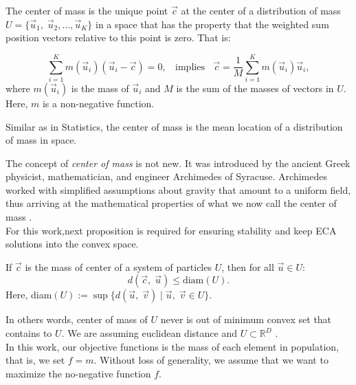 \documentclass[graybox]{svmult}
\begin{document}
\begin{definition}
	The center of mass is the unique point $\vec{c}$ at the center of a distribution
	of mass $U = \{\vec{u}_1,\; \vec{u}_2 , \ldots , \vec{u}_K \}$ in a space that 
	has the property that the weighted sum position vectors relative to this point 
	is zero. That is:

	\begin{equation}
		\sum_{i = 1}^K m(\vec{u}_i) (\vec{u}_i - \vec{c}) = 0, \;\; \text{ implies } \;\; 
		\vec{c} = \dfrac{1}{M} \sum_{i = 1}^K  m(\vec{u}_i)  \vec{u}_i,
		\label{eq:masscenter}
	\end{equation}
	where $m(\vec{u}_i)$ is the mass of $\vec{u}_i$ and  $M$ is the sum of the 
	masses of vectors in $U$. Here, $m$ is a non-negative function.
\end{definition}
%
%
\begin{note}
Similar as in Statistics, the center of mass is the mean location of a distribution 
of mass in space.
\end{note}
% 
The concept of \textit{center of mass} is not new. It was introduced by the ancient 
Greek physicist, mathematician, and engineer Archimedes of Syracuse. Archimedes 
worked with simplified assumptions about gravity that amount to a uniform field, 
thus arriving at the mathematical properties of what we now call the center of mass \cite{kleppner73}.\\

For this work,next proposition is required for ensuring stability and keep ECA 
solutions into the convex space.

\begin{proposition}
	If $\vec{c}$ is the mass of center of a system of particles $U$, then  for all $ \vec{u}\in U $:
	$$  d(\vec{c},\; \vec{u} )  \leq \text{diam}(U). $$
	Here, diam$(U) := \sup\{ d(\vec{u},\; \vec{v} ) \; | \; \vec{u} ,\; \vec{v} \in U \}$.
\end{proposition}
%
\noindent
In others words, center of mass of $U$ never is out of minimum	convex set that 
contains to $U$. We are assuming euclidean distance and $U \subset \mathbb{R}^D$ \cite{rudin}.\\

%
% 
%

In this work, our objective functions is the mass of each element in population, 
that is, we set $f = m$. Without loss of generality, we assume that we want to maximize 
the no-negative function $f$.
\end{document}
